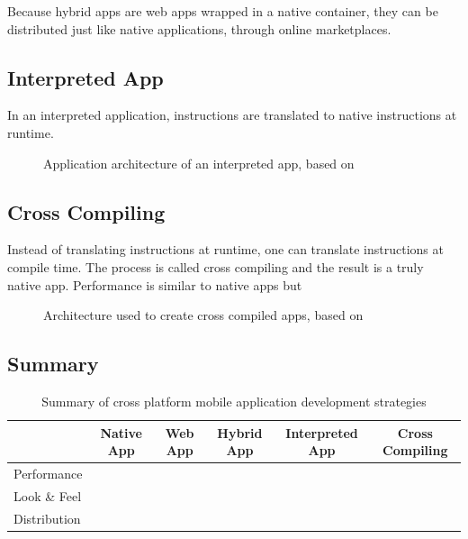 \npar Because hybrid apps are web apps wrapped in a native container, they can be distributed just like native applications, through online marketplaces. 

\subsection{Interpreted App}

\npar In an interpreted application, instructions are translated to native instructions at runtime.

\begin{figure}[h!]
    \begin{center}
        \caption{
            Application architecture of an interpreted app, based on \citep{Friese}
        }
        \label{fig:interpreted}
    \end{center}
\end{figure}

\subsection{Cross Compiling}

\npar Instead of translating instructions at runtime, one can translate instructions at compile time. The process is called cross compiling and the result is a truly native app. Performance is similar to native apps but 

\begin{figure}[h!]
    \begin{center}
        \caption{
            Architecture used to create cross compiled apps, based on \citep{Friese}
        }
        \label{fig:crosscompiled}
    \end{center}
\end{figure}

\subsection{Summary}

\begin{table}[h!]
    \begin{center}
        \begin{tabular}{l|c|c|c|c|c}
                         & Native App & Web App & Hybrid App & Interpreted App & Cross Compiling\\\hline
            Performance  &            &         &            &                 &                \\
            Look \& Feel &            &         &            &                 &                \\
            Distribution &            &         &            &                 &                \\
            
        \end{tabular}
		\caption{
			Summary of cross platform mobile application development strategies
		}
		\label{tab:architectures}
    \end{center}
\end{table}

